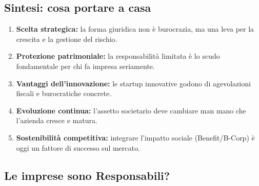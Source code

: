\documentclass[a4paper,12pt]{article}
\begin{document}
	\subsection{Sintesi: cosa portare a casa}
	
	\begin{enumerate}
		\item \textbf{Scelta strategica:} la forma giuridica non è burocrazia, ma una leva per la crescita e la gestione del rischio.
		\item \textbf{Protezione patrimoniale:} la responsabilità limitata è lo scudo fondamentale per chi fa impresa seriamente.
		\item \textbf{Vantaggi dell'innovazione:} le startup innovative godono di agevolazioni fiscali e burocratiche concrete.
		\item \textbf{Evoluzione continua:} l'assetto societario deve cambiare man mano che l'azienda cresce e matura.
		\item \textbf{Sostenibilità competitiva:} integrare l'impatto sociale (Benefit/B-Corp) è oggi un fattore di successo sul mercato.
	\end{enumerate}
	
	\subsection{Le imprese sono Responsabili?}
	
\end{document}

